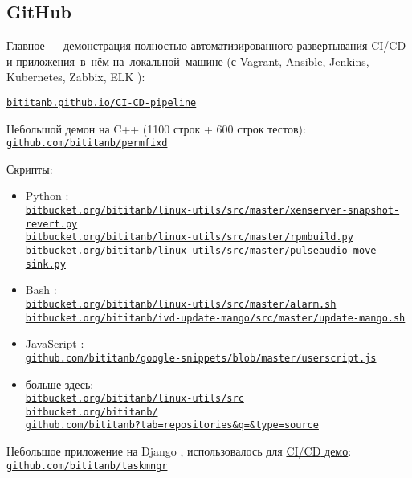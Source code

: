 \documentclass[11pt, a4paper]{article}
\newcommand{\Delimitline}{
  \vspace{-2ex}
  \noindent\makebox[\linewidth]{\rule{\DelimitlineLength}{0.12ex}} }
\newcommand\rurl[1]{%
  \-\hspace{0.5em}
  \href{http://#1}{\nolinkurl{#1}}%
}
\newcommand\Eng[1]{%
  \foreignlanguage{english}{#1}%
}
\newcommand{\forceindent}{\leavevmode{\parindent=1.5em\indent}}
\begin{document}

\subsection*{GitHub}
\Delimitline

{
\raggedright
\forceindent Главное — демонстрация полностью автоматизированного развертывания \Eng{CI/CD} и приложения~в~нём на~локальной~машине
(с \Eng{Vagrant, Ansible, Jenkins, Kubernetes, Zabbix, ELK}):
\vspace{0.4ex}\\
  {
  \rurl{bititanb.github.io/CI-CD-pipeline}
  }
}
  
\vspace{2.5ex}

Небольшой демон на \Eng{C++} (1100 строк + 600 строк тестов):
\vspace{0.4ex}\\
  \rurl{github.com/bititanb/permfixd}
  
Скрипты:
\begin{itemize}
  \item \Eng{Python}:
    \vspace{0.2em}\\
    \rurl{bitbucket.org/bititanb/linux-utils/src/master/xenserver-snapshot-revert.py}\\
    \rurl{bitbucket.org/bititanb/linux-utils/src/master/rpmbuild.py}\\
    \rurl{bitbucket.org/bititanb/linux-utils/src/master/pulseaudio-move-sink.py}
  \item \Eng{Bash}:
    \vspace{0.2ex}\\
    \rurl{bitbucket.org/bititanb/linux-utils/src/master/alarm.sh}\\
    \rurl{bitbucket.org/bititanb/ivd-update-mango/src/master/update-mango.sh}
  \item \Eng{JavaScript}:
    \vspace{0.2ex}\\
    \rurl{github.com/bititanb/google-snippets/blob/master/userscript.js}
  \item больше здесь:
    \vspace{0.2ex}\\
    \rurl{bitbucket.org/bititanb/linux-utils/src}\\
    \rurl{bitbucket.org/bititanb/}\\
    \rurl{github.com/bititanb?tab=repositories&q=&type=source}
\end{itemize}
Небольшое приложение на \Eng{Django}, использовалось для \href{https://github.com/bititanb/CI-CD-pipeline}{\Eng{CI/CD} демо}:
\vspace{0.4ex}\\
  \rurl{github.com/bititanb/taskmngr}
\end{document}
